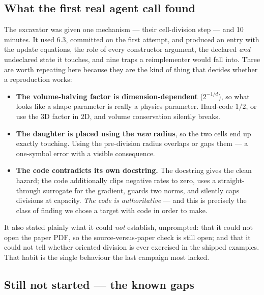 \documentclass[11pt,a4paper]{article}
\begin{document}
\subsection{What the first real agent call found}

The excavator was given one mechanism --- their cell-division step --- and 10 minutes. It used 6.3,
committed on the first attempt, and produced an entry with the update equations, the role of every
constructor argument, the declared \emph{and} undeclared state it touches, and nine traps a
reimplementer would fall into. Three are worth repeating here because they are the kind of thing
that decides whether a reproduction works:

\begin{itemize}
\item \textbf{The volume-halving factor is dimension-dependent} ($2^{-1/d}$), so what looks like a
shape parameter is really a physics parameter. Hard-code $1/2$, or use the 3D factor in 2D, and
volume conservation silently breaks.
\item \textbf{The daughter is placed using the \emph{new} radius}, so the two cells end up exactly
touching. Using the pre-division radius overlaps or gaps them --- a one-symbol error with a visible
consequence.
\item \textbf{The code contradicts its own docstring.} The docstring gives the clean hazard; the
code additionally clips negative rates to zero, uses a straight-through surrogate for the
gradient, guards two norms, and silently caps divisions at capacity. \emph{The code is
authoritative} --- and this is precisely the class of finding we chose a target with code in order
to make.
\end{itemize}

It also stated plainly what it could \emph{not} establish, unprompted: that it could not open the
paper PDF, so the source-versus-paper check is still open; and that it could not tell whether
oriented division is ever exercised in the shipped examples. That habit is the single behaviour
the last campaign most lacked.

\subsection{Still not started --- the known gaps}
\end{document}
